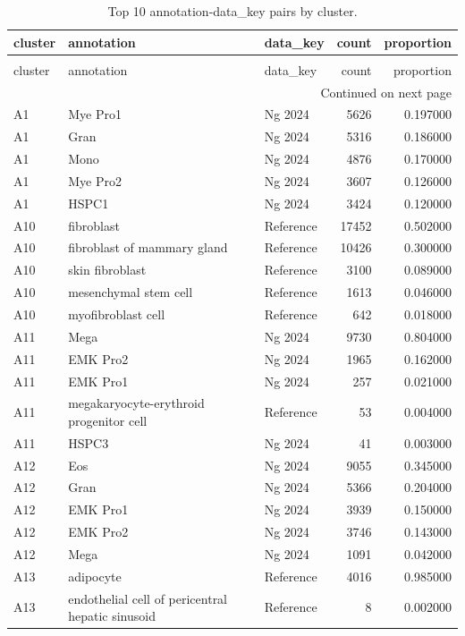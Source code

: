 \begin{longtable}{lllrr}
\caption{Top 10 annotation-data_key pairs by cluster.} \label{tab:cluster_summary} \\
\toprule
cluster & annotation & data\_key & count & proportion \\
\midrule
\endfirsthead
\caption[]{Top 10 annotation-data_key pairs by cluster.} \\
\toprule
cluster & annotation & data\_key & count & proportion \\
\midrule
\endhead
\midrule
\multicolumn{5}{r}{Continued on next page} \\
\midrule
\endfoot
\bottomrule
\endlastfoot
A1 & Mye Pro1 & Ng 2024 & 5626 & 0.197000 \\
A1 & Gran & Ng 2024 & 5316 & 0.186000 \\
A1 & Mono & Ng 2024 & 4876 & 0.170000 \\
A1 & Mye Pro2 & Ng 2024 & 3607 & 0.126000 \\
A1 & HSPC1 & Ng 2024 & 3424 & 0.120000 \\
A10 & fibroblast & Reference & 17452 & 0.502000 \\
A10 & fibroblast of mammary gland & Reference & 10426 & 0.300000 \\
A10 & skin fibroblast & Reference & 3100 & 0.089000 \\
A10 & mesenchymal stem cell & Reference & 1613 & 0.046000 \\
A10 & myofibroblast cell & Reference & 642 & 0.018000 \\
A11 & Mega & Ng 2024 & 9730 & 0.804000 \\
A11 & EMK Pro2 & Ng 2024 & 1965 & 0.162000 \\
A11 & EMK Pro1 & Ng 2024 & 257 & 0.021000 \\
A11 & megakaryocyte-erythroid progenitor cell & Reference & 53 & 0.004000 \\
A11 & HSPC3 & Ng 2024 & 41 & 0.003000 \\
A12 & Eos & Ng 2024 & 9055 & 0.345000 \\
A12 & Gran & Ng 2024 & 5366 & 0.204000 \\
A12 & EMK Pro1 & Ng 2024 & 3939 & 0.150000 \\
A12 & EMK Pro2 & Ng 2024 & 3746 & 0.143000 \\
A12 & Mega & Ng 2024 & 1091 & 0.042000 \\
A13 & adipocyte & Reference & 4016 & 0.985000 \\
A13 & endothelial cell of pericentral hepatic sinusoid & Reference & 8 & 0.002000 \\

\end{longtable}
